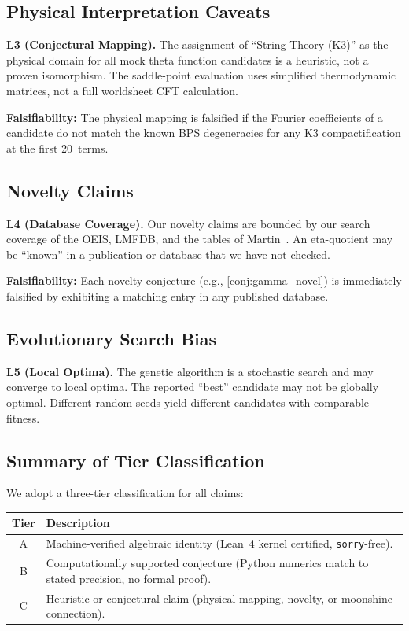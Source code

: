 \subsection{Physical Interpretation Caveats}

\textbf{L3 (Conjectural Mapping).}  The assignment of
``String Theory (K3)'' as the physical domain for all
mock theta function candidates is a heuristic, not a
proven isomorphism.  The saddle-point evaluation uses
simplified thermodynamic matrices, not a full
worldsheet CFT calculation.

\textbf{Falsifiability:}  The physical mapping is
falsified if the Fourier coefficients of a candidate
do not match the known BPS degeneracies for any K3
compactification at the first 20~terms.

\subsection{Novelty Claims}

\textbf{L4 (Database Coverage).}  Our novelty claims
are bounded by our search coverage of the OEIS, LMFDB,
and the tables of Martin~\cite{martin_1996}.  An
eta-quotient may be ``known'' in a publication or
database that we have not checked.

\textbf{Falsifiability:}  Each novelty conjecture
(e.g., \cref{conj:gamma_novel}) is immediately falsified
by exhibiting a matching entry in any published
database.

\subsection{Evolutionary Search Bias}

\textbf{L5 (Local Optima).}  The genetic algorithm is a
stochastic search and may converge to local optima.
The reported ``best'' candidate may not be globally
optimal.  Different random seeds yield different
candidates with comparable fitness.

\subsection{Summary of Tier Classification}

We adopt a three-tier classification for all claims:
\begin{center}
\begin{tabular}{cp{10cm}}
\toprule
\textbf{Tier} & \textbf{Description} \\
\midrule
A & Machine-verified algebraic identity (Lean~4 kernel
    certified, \texttt{sorry}-free). \\
B & Computationally supported conjecture (Python
    numerics match to stated precision, no formal proof). \\
C & Heuristic or conjectural claim (physical mapping,
    novelty, or moonshine connection). \\
\bottomrule
\end{tabular}
\end{center}
